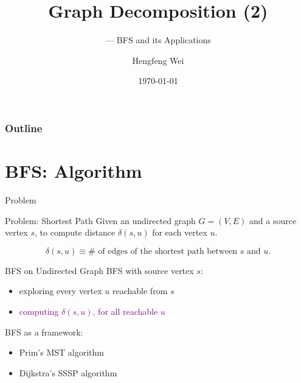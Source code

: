 \documentclass{beamer}
\title{Graph Decomposition (2)}
\subtitle{--- BFS and its Applications}
\author{Hengfeng Wei}
\institute{hengxin0912@gmail.com}
\date{\today}
\begin{document}
\begin{frame}
	\titlepage
\end{frame}

\begin{frame}
	\frametitle{Outline}
	\tableofcontents
\end{frame}

\section{BFS: Algorithm}

\begin{frame}{Problem}
  \begin{exampleblock}{Problem: Shortest Path}
    Given an undirected graph $G = (V, E)$ and a source vertex $s$,
    to compute distance $\delta(s, u)$ for each vertex $u$.
  \end{exampleblock}

  \[
    \delta(s,u) \equiv \# \textrm{ of edges of the shortest path between } s
    \textrm{ and } u.
  \]
\end{frame}
\begin{frame}{BFS on Undirected Graph}
  BFS with source vertex $s$:
  \begin{itemize}
    \item exploring every vertex $u$ reachable from $s$
    \item \textcolor{purple}{computing $\delta(s,u)$, for all reachable $u$}
  \end{itemize}

  \vspace{0.50cm}
  BFS as a framework:
  \begin{itemize}
    \item Prim's MST algorithm
    \item Dijkstra's SSSP algorithm
  \end{itemize}
\end{frame}
\end{document}
